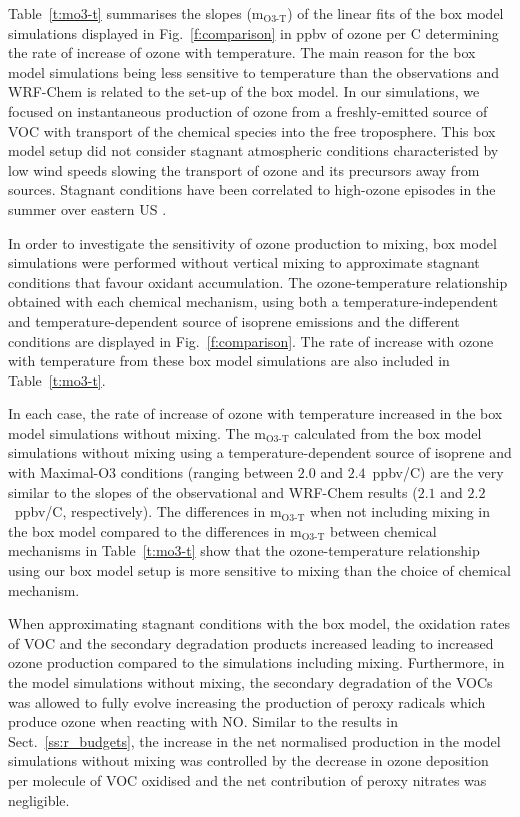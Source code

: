 Table~\ref{t:mo3-t} summarises the slopes (m$_{\text{O3-T}}$) of the linear fits of the box model simulations displayed in Fig.~\ref{f:comparison} in ppbv of ozone per \degree C determining the rate of increase of ozone with temperature.
The main reason for the box model simulations being less sensitive to temperature than the observations and WRF-Chem is related to the set-up of the box model.
In our simulations, we focused on instantaneous production of ozone from a freshly-emitted source of VOC with transport of the chemical species into the free troposphere.
This box model setup did not consider stagnant atmospheric conditions characteristed by low wind speeds slowing the transport of ozone and its precursors away from sources.
Stagnant conditions have been correlated to high-ozone episodes in the summer over eastern US \citep{Jacob:1993}.

In order to investigate the sensitivity of ozone production to mixing, box model simulations were performed without vertical mixing to approximate stagnant conditions that favour oxidant accumulation.
The ozone-temperature relationship obtained with each chemical mechanism, using both a temperature-independent and temperature-dependent source of isoprene emissions and the different  conditions are displayed in Fig.~\ref{f:comparison}.
The rate of increase with ozone with temperature from these box model simulations are also included in Table~\ref{t:mo3-t}.

In each case, the rate of increase of ozone with temperature increased in the box model simulations without mixing.
The m$_{\text{O3-T}}$ calculated from the box model simulations without mixing using a temperature-dependent source of isoprene and with Maximal-O3 conditions (ranging between $2.0$ and $2.4$~ppbv/\degree C) are the very similar to the slopes of the observational and WRF-Chem results ($2.1$ and $2.2$~ppbv/\degree C, respectively).
The differences in m$_{\text{O3-T}}$ when not including mixing in the box model compared to the differences in m$_{\text{O3-T}}$ between chemical mechanisms in Table~\ref{t:mo3-t} show that the ozone-temperature relationship using our box model setup is more sensitive to mixing than the choice of chemical mechanism.

When approximating stagnant conditions with the box model, the oxidation rates of VOC and the secondary degradation products increased leading to increased ozone production compared to the simulations including mixing.
Furthermore, in the model simulations without mixing, the secondary degradation of the VOCs was allowed to fully evolve increasing the production of peroxy radicals which produce ozone when reacting with NO.
Similar to the results in Sect.~\ref{ss:r_budgets}, the increase in the net normalised  production in the model simulations without mixing was controlled by the decrease in ozone deposition per molecule of VOC oxidised and the net contribution of peroxy nitrates was negligible.

